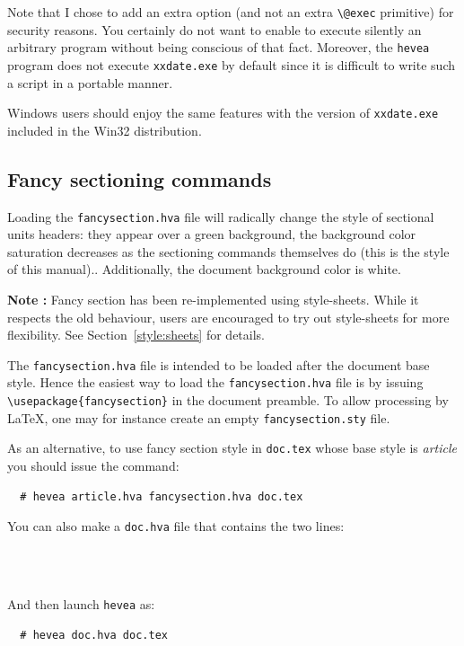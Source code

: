 Note that I chose to add an extra option (and not an extra
\verb+\@exec+ primitive) for security reasons. You certainly do
not want to enable \hevea{} to execute silently an arbitrary program
without being conscious of that fact.
Moreover, the \texttt{hevea} program does not execute
\texttt{xxdate.exe} by default since it is difficult to write such 
a script in a portable manner.

Windows users should enjoy the same features with the version of
\texttt{xxdate.exe} included in the Win32 distribution.   


\subsection{Fancy \label{fancysection}sectioning commands}
%
%
Loading the \texttt{fancysection.hva} file will radically change the
style of sectional units headers: they appear over a green
background, the background color saturation decreases as the sectioning
commands themselves do\ifhevea{} (this is the style of this manual).\else.\fi{}
Additionally, the document background color is white.

\textbf{Note : }Fancy section has been re-implemented using style-sheets. While it respects the old behaviour, users are encouraged to try out style-sheets for more flexibility. See Section~\ref{style:sheets} for details.


The \texttt{fancysection.hva} file is intended to be loaded after
the document base style.
Hence the easiest way to load the \texttt{fancysection.hva} file
is by issuing \verb+\usepackage{fancysection}+ in the document preamble.
To allow processing by \LaTeX, one may for instance create
an empty \texttt{fancysection.sty} file.

As an alternative, to use fancy section style in
\texttt{doc.tex} whose base style is \textit{article}
you should issue the command:
\begin{verbatim}
  # hevea article.hva fancysection.hva doc.tex
\end{verbatim}
You can also make a \texttt{doc.hva} file that contains the two lines:
\begin{verbatim}
  
  
\end{verbatim}
And then launch \texttt{hevea} as:
\begin{verbatim}
  # hevea doc.hva doc.tex
\end{verbatim}

